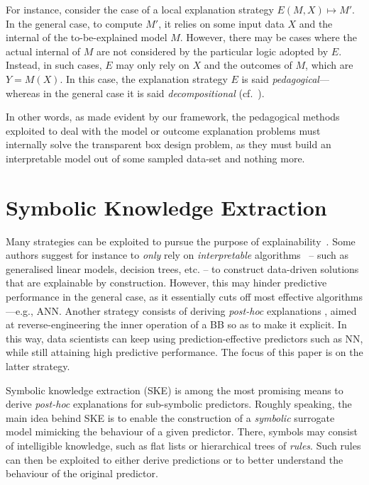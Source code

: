 \documentclass[12pt,a4paper,openright,twoside]{book}
\begin{document}
For instance, consider the case of a local explanation strategy $E(M, X) \mapsto M'$.
%
In the general case, to compute $M'$, it relies on some input data $X$ and the internal of the to-be-explained model $M$.
%
However, there may be cases where the actual internal of $M$ are not considered by the particular logic adopted by $E$.
%
Instead, in such cases, $E$ may only rely on $X$ and the outcomes of $M$, which are $Y = M(X)$.
%
In this case, the explanation strategy $E$ is said \emph{pedagogical}---whereas in the general case it is said \emph{decompositional} (cf.\ \cite{AndrewsDT95}).

In other words, as made evident by our framework, the pedagogical methods exploited to deal with the model or outcome explanation problems must internally solve the transparent box design problem, as they must build an interpretable model out of some sampled data-set and nothing more.

\section{Symbolic Knowledge Extraction}\label{sec:knowledge-extraction}


Many strategies can be exploited to pursue the purpose of explainability~\cite{GuidottiMRTGP19}.
%
Some authors suggest for instance to \emph{only} rely on \emph{interpretable} algorithms~\cite{Rudin2019} -- such as generalised linear models, decision trees, etc. -- to construct data-driven solutions that are explainable by construction.
%
However, this may hinder predictive performance in the general case, as it essentially cuts off most effective algorithms---e.g., ANN.
%
Another strategy consists of deriving \emph{post-hoc} explanations \cite{KENNY2021103459}, aimed at reverse-engineering the inner operation of a BB so as to make it explicit.
%
In this way, data scientists can keep using prediction-effective predictors such as NN, while still attaining high predictive performance.
%
The focus of this paper is on the latter strategy.

Symbolic knowledge extraction (SKE) \cite{GarcezBG01} is among the most promising means to derive \emph{post-hoc} explanations for sub-symbolic predictors.
%
Roughly speaking, the main idea behind SKE is to enable the construction of a \emph{symbolic} surrogate model mimicking the behaviour of a given predictor.
%
There, symbols may consist of intelligible knowledge, such as flat lists or hierarchical trees of \emph{rules}.
%
Such rules can then be exploited to either derive predictions or to better understand the behaviour of the original predictor.
\end{document}
